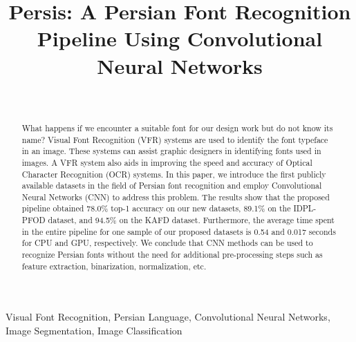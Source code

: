 \documentclass[conference]{IEEEtran}
\title{Persis: A Persian Font Recognition Pipeline Using Convolutional Neural Networks}
\begin{document}
\renewcommand\IEEEkeywordsname{Keywords}


\author{
     \\
    \and
}


\maketitle
\thispagestyle{firstpage}

\begin{abstract}
What happens if we encounter a suitable font for our design work but do not know its name? Visual Font Recognition (VFR) systems are used to identify the font typeface in an image. These systems can assist graphic designers in identifying fonts used in images. A VFR system also aids in improving the speed and accuracy of Optical Character Recognition (OCR) systems. In this paper, we introduce the first publicly available datasets in the field of Persian font recognition and employ Convolutional Neural Networks (CNN) to address this problem. 
The results show that the proposed pipeline obtained 78.0\% top-1 accuracy on our new datasets, 89.1\% on the IDPL-PFOD dataset, and 94.5\% on the KAFD dataset. Furthermore, the average time spent in the entire pipeline for one sample of our proposed datasets is 0.54 and 0.017 seconds for CPU and GPU, respectively. We conclude that CNN methods can be used to recognize Persian fonts without the need for additional pre-processing steps such as feature extraction, binarization, normalization, etc.
\end{abstract}
 \begin{IEEEkeywords}
Visual Font Recognition, Persian Language, Convolutional Neural Networks, Image Segmentation, Image Classification
\end{IEEEkeywords}
\end{document}
